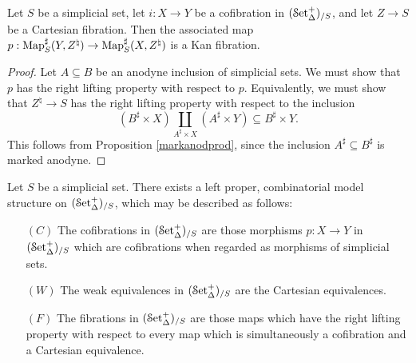 \begin{lemma}\label{insdod}
Let $S$ be a simplicial set, let $i: X \rightarrow Y$ be a cofibration in $(\operatorname{\mathcal{S}et_{\Delta}^{+}})_{/S}$, and let $Z \rightarrow S$ be a Cartesian fibration. Then the associated map $p: \operatorname{{Map}}_{S}^{\sharp}(Y,Z^{\natural}) \rightarrow \operatorname{{Map}}_{S}^{\sharp}(X, Z^{\natural})$ is a Kan fibration.
\end{lemma}

\begin{proof}
Let $A \subseteq B$ be an anodyne inclusion of simplicial sets. We must show that $p$ has the right lifting property with respect to $p$. Equivalently, we must show that $Z^{\natural} \rightarrow S$ has the right lifting property with respect to the inclusion
$$ (B^{\sharp} \times X) \coprod_{A^{\sharp} \times X} (A^{\sharp} \times Y) \subseteq
B^{\sharp} \times Y.$$
This follows from Proposition \ref{markanodprod}, since the inclusion $A^{\sharp} \subseteq B^{\sharp}$ is marked anodyne.
\end{proof}

\begin{proposition}\label{markmodell}
Let $S$ be a simplicial set. There exists a left proper, combinatorial model structure on $(\operatorname{\mathcal{S}et_{\Delta}^{+}})_{/S}$, which may be described as follows:

\begin{itemize}
\item[$(C)$] The cofibrations in $(\operatorname{\mathcal{S}et_{\Delta}^{+}})_{/S}$ are those morphisms $p: X \rightarrow Y$ in $(\operatorname{\mathcal{S}et_{\Delta}^{+}})_{/S}$ which are cofibrations when regarded as morphisms of simplicial sets.

\item[$(W)$] The weak equivalences in $(\operatorname{\mathcal{S}et_{\Delta}^{+}})_{/S}$ are the Cartesian equivalences.

\item[$(F)$] The fibrations in $(\operatorname{\mathcal{S}et_{\Delta}^{+}})_{/S}$ are those maps which have the right lifting property with respect to every map which is simultaneously a cofibration and a Cartesian equivalence.
\end{itemize}
\end{proposition}

